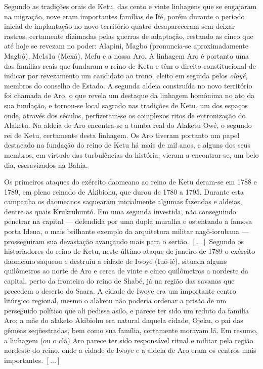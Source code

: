\begin{citacao}
Segundo as tradições orais de Ketu, das cento e vinte linhagens que se engajaram na migração, nove eram importantes famílias de Ifé, porém durante o período inicial de implantação no novo território quatro desapareceram sem deixar rastros, certamente dizimadas pelas guerras de adaptação, restando as cinco que até hoje se revezam no poder: Alapini, Magbo (pronuncia-se aproximadamente Magbô), Me1s1a (Mexá), Mefu e a nossa Aro. A linhagem Aro é portanto uma das famílias reais que fundaram o reino de Ketu e têm o direito constitucional de indicar por revezamento um candidato ao trono, eleito em seguida pelos \textit{oloyé}, membros do conselho de Estado. A segunda aldeia construída no novo território foi chamada de Aro, o que revela um destaque da linhagem homônima no ato da sua fundação, e tornou-se local sagrado nas tradições de Ketu, um dos espaços onde, através dos séculos, perfizeram-se os complexos ritos de entronização do Alaketu. Na aldeia de Aro encontra-se a tumba real do Alaketu Owé, o segundo rei de Ketu, certamente desta linhagem. Os Aro tiveram portanto um papel destacado na fundação do reino de Ketu há mais de mil anos, e alguns dos seus membros, em virtude das turbulências da história, vieram a encontrar-se, um belo dia, escravizados na Bahia. 

Os primeiros ataques do exército daomeano ao reino de Ketu deram-se em 1788 e 1789, em pleno reinado de Akibiohu, que durou de 1780 a 1795. Durante esta campanha os daomeanos saquearam inicialmente algumas fazendas e aldeias, dentre as quais Krukruhuntó. Em uma segunda investida, não conseguindo penetrar na capital — defendida por uma dupla muralha e ostentando a famosa porta Idena, o mais brilhante exemplo da arquitetura militar nagô-iorubana — prosseguiram sua devastação avançando mais para o sertão. \([\dots]\) Segundo os historiadores do reino de Ketu, neste último ataque de janeiro de 1789 o exército daomeano saqueou e destruiu a cidade de Iwoye (Iuó-iê), situada alguns quilômetros ao norte de Aro e cerca de vinte e cinco quilômetros a nordeste da capital, perto da fronteira do reino de Shabé, já na região das savanas que precedem o deserto do Saara. A cidade de Iwoye era um importante centro litúrgico regional, mesmo o alaketu não poderia ordenar a prisão de um perseguido político que ali pedisse asilo, e parece ter sido um reduto da família Aro; a mãe do alaketo Akibiohu era natural daquela cidade, Ojeku, o pai das gêmeas seqüestradas, bem como sua família, certamente moravam lá. Em resumo, a linhagem (ou o clã) Aro parece ter sido responsável ritual e militar pela região nordeste do reino, onde a cidade de Iwoye e a aldeia de Aro eram os centros mais importantes. \([\dots]\)


\end{citacao}
